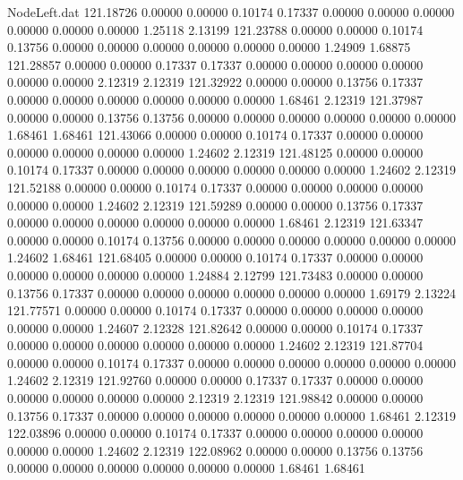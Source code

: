\begin{filecontents}{NodeLeft.dat}
 121.18726    0.00000    0.00000     0.10174    0.17337    0.00000    0.00000    0.00000    0.00000    0.00000    0.00000    1.25118    2.13199
 121.23788    0.00000    0.00000     0.10174    0.13756    0.00000    0.00000    0.00000    0.00000    0.00000    0.00000    1.24909    1.68875
 121.28857    0.00000    0.00000     0.17337    0.17337    0.00000    0.00000    0.00000    0.00000    0.00000    0.00000    2.12319    2.12319
 121.32922    0.00000    0.00000     0.13756    0.17337    0.00000    0.00000    0.00000    0.00000    0.00000    0.00000    1.68461    2.12319
 121.37987    0.00000    0.00000     0.13756    0.13756    0.00000    0.00000    0.00000    0.00000    0.00000    0.00000    1.68461    1.68461
 121.43066    0.00000    0.00000     0.10174    0.17337    0.00000    0.00000    0.00000    0.00000    0.00000    0.00000    1.24602    2.12319
 121.48125    0.00000    0.00000     0.10174    0.17337    0.00000    0.00000    0.00000    0.00000    0.00000    0.00000    1.24602    2.12319
 121.52188    0.00000    0.00000     0.10174    0.17337    0.00000    0.00000    0.00000    0.00000    0.00000    0.00000    1.24602    2.12319
 121.59289    0.00000    0.00000     0.13756    0.17337    0.00000    0.00000    0.00000    0.00000    0.00000    0.00000    1.68461    2.12319
 121.63347    0.00000    0.00000     0.10174    0.13756    0.00000    0.00000    0.00000    0.00000    0.00000    0.00000    1.24602    1.68461
 121.68405    0.00000    0.00000     0.10174    0.17337    0.00000    0.00000    0.00000    0.00000    0.00000    0.00000    1.24884    2.12799
 121.73483    0.00000    0.00000     0.13756    0.17337    0.00000    0.00000    0.00000    0.00000    0.00000    0.00000    1.69179    2.13224
 121.77571    0.00000    0.00000     0.10174    0.17337    0.00000    0.00000    0.00000    0.00000    0.00000    0.00000    1.24607    2.12328
 121.82642    0.00000    0.00000     0.10174    0.17337    0.00000    0.00000    0.00000    0.00000    0.00000    0.00000    1.24602    2.12319
 121.87704    0.00000    0.00000     0.10174    0.17337    0.00000    0.00000    0.00000    0.00000    0.00000    0.00000    1.24602    2.12319
 121.92760    0.00000    0.00000     0.17337    0.17337    0.00000    0.00000    0.00000    0.00000    0.00000    0.00000    2.12319    2.12319
 121.98842    0.00000    0.00000     0.13756    0.17337    0.00000    0.00000    0.00000    0.00000    0.00000    0.00000    1.68461    2.12319
 122.03896    0.00000    0.00000     0.10174    0.17337    0.00000    0.00000    0.00000    0.00000    0.00000    0.00000    1.24602    2.12319
 122.08962    0.00000    0.00000     0.13756    0.13756    0.00000    0.00000    0.00000    0.00000    0.00000    0.00000    1.68461    1.68461

\end{filecontents}
